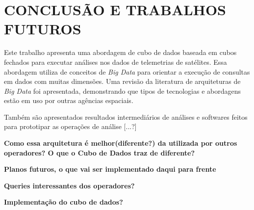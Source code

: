 
\chapter{CONCLUSÃO E TRABALHOS FUTUROS}

Este trabalho apresenta uma abordagem de cubo de dados baseada em cubos fechados para executar análises nos dados de telemetrias de satélites. Essa abordagem utiliza de conceitos de \textit{Big Data} para orientar a execução de consultas em dados com muitas dimensões. Uma revisão da literatura de arquiteturas de \textit{Big Data} foi apresentada, demonstrando que tipos de tecnologias e abordagens estão em uso por outras agências espaciais.

Também são apresentados resultados intermediários de análises e softwares feitos para prototipar as operações de análise [...?]

\textbf{Como essa arquitetura é melhor(diferente?) da utilizada por outros operadores? O que o Cubo de Dados traz de diferente?}

\textbf{Planos futuros, o que vai ser implementado daqui para frente}

\textbf{Queries interessantes dos operadores?}

\textbf{Implementação do cubo de dados?}

